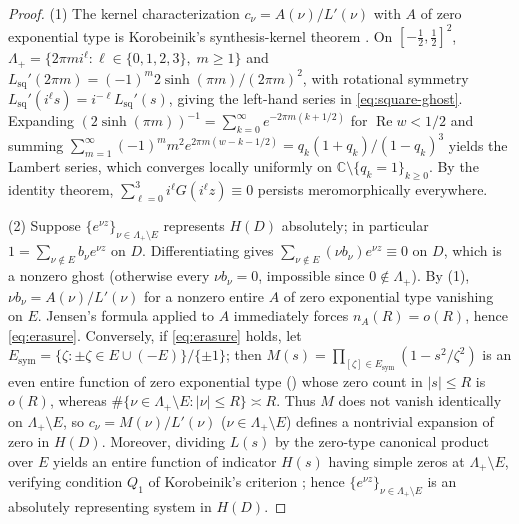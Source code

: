 \documentclass[11pt,reqno]{amsart}
\theoremstyle{definition}
\theoremstyle{remark}
\newcommand{\C}{\mathbb{C}}
\begin{document}
\begin{proof}
(1) The kernel characterization $c_\nu = A(\nu)/L'(\nu)$ with $A$ of zero exponential type is Korobeinik's synthesis-kernel theorem \cite{Korobeinik1975,Korobeinik1981UMN}. On $[-\frac12,\frac12]^2$, $\Lambda_+ = \{2\pi m i^\ell : \ell \in \{0,1,2,3\},\; m \ge 1\}$ and $L_{\mathrm{sq}}'(2\pi m) = (-1)^m 2\sinh(\pi m)/(2\pi m)^2$, with rotational symmetry $L_{\mathrm{sq}}'(i^\ell s) = i^{-\ell} L_{\mathrm{sq}}'(s)$, giving the left-hand series in \eqref{eq:square-ghost}. Expanding $(2\sinh(\pi m))^{-1} = \sum_{k=0}^\infty e^{-2\pi m(k + 1/2)}$ for $\operatorname{Re} w < 1/2$ and summing $\sum_{m=1}^\infty (-1)^m m^2 e^{2\pi m(w - k - 1/2)} = q_k(1+q_k)/(1-q_k)^3$ yields the Lambert series, which converges locally uniformly on $\C \setminus \{q_k = 1\}_{k \ge 0}$. By the identity theorem, $\sum_{\ell=0}^3 i^\ell G(i^\ell z) \equiv 0$ persists meromorphically everywhere.

(2) Suppose $\{e^{\nu z}\}_{\nu \in \Lambda_+ \setminus E}$ represents $H(D)$ absolutely; in particular $1 = \sum_{\nu \notin E} b_\nu e^{\nu z}$ on $D$. Differentiating gives $\sum_{\nu \notin E} (\nu b_\nu) e^{\nu z} \equiv 0$ on $D$, which is a nonzero ghost (otherwise every $\nu b_\nu = 0$, impossible since $0 \notin \Lambda_+$). By (1), $\nu b_\nu = A(\nu)/L'(\nu)$ for a nonzero entire $A$ of zero exponential type vanishing on $E$. Jensen's formula applied to $A$ immediately forces $n_A(R) = o(R)$, hence \eqref{eq:erasure}. Conversely, if \eqref{eq:erasure} holds, let $E_{\mathrm{sym}} = \{\zeta : \pm\zeta \in E \cup (-E)\}/\!\{\pm 1\}$; then $M(s) = \prod_{[\zeta] \in E_{\mathrm{sym}}} (1 - s^2/\zeta^2)$ is an even entire function of zero exponential type (\cite[Ch.~I]{LevinBook}) whose zero count in $|s| \le R$ is $o(R)$, whereas $\#\{\nu \in \Lambda_+ \setminus E : |\nu| \le R\} \asymp R$. Thus $M$ does not vanish identically on $\Lambda_+ \setminus E$, so $c_\nu = M(\nu)/L'(\nu)$ ($\nu \in \Lambda_+ \setminus E$) defines a nontrivial expansion of zero in $H(D)$. Moreover, dividing $L(s)$ by the zero-type canonical product over $E$ yields an entire function of indicator $H(s)$ having simple zeros at $\Lambda_+ \setminus E$, verifying condition $Q_1$ of Korobeinik's criterion \cite[Ch.~III, \S 1, Theorem~6]{Korobeinik1981UMN}; hence $\{e^{\nu z}\}_{\nu \in \Lambda_+ \setminus E}$ is an absolutely representing system in $H(D)$.


\end{proof}
\end{document}
